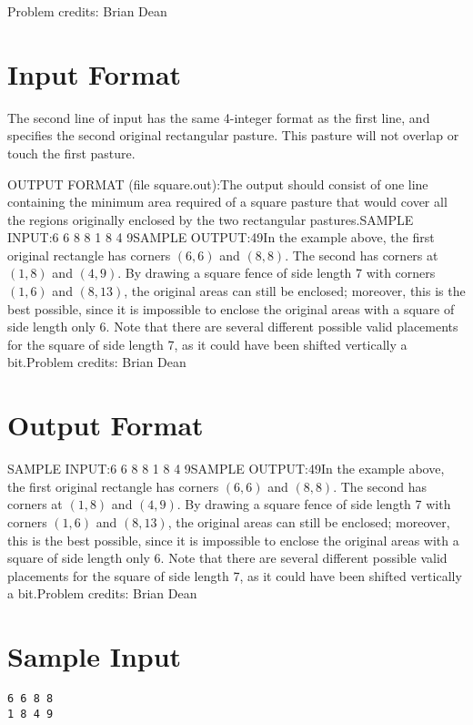 \documentclass[12pt]{article}
\begin{document}
Problem credits: Brian Dean



\section*{Input Format}
The second line of input has the same 4-integer format as the first line, and
specifies the second original rectangular pasture.  This pasture will not
overlap or touch the first pasture.

OUTPUT FORMAT (file square.out):The output should consist of one line containing the minimum area required of a
square pasture that would cover all the regions originally enclosed by the two
rectangular pastures.SAMPLE INPUT:6 6 8 8
1 8 4 9SAMPLE OUTPUT:49In the example above, the first original rectangle has corners $(6,6)$ and
$(8,8)$. The second has corners at $(1,8)$ and $(4,9)$.  By drawing a square fence
of side length 7 with corners $(1,6)$ and $(8,13)$, the original areas can still be enclosed; moreover, this is the best possible, since it is impossible to enclose the original areas with a square of side length only 6.  Note that there are several different possible valid placements for the square of side length 7, as it could have been shifted vertically a bit.Problem credits: Brian Dean

\section*{Output Format}
SAMPLE INPUT:6 6 8 8
1 8 4 9SAMPLE OUTPUT:49In the example above, the first original rectangle has corners $(6,6)$ and
$(8,8)$. The second has corners at $(1,8)$ and $(4,9)$.  By drawing a square fence
of side length 7 with corners $(1,6)$ and $(8,13)$, the original areas can still be enclosed; moreover, this is the best possible, since it is impossible to enclose the original areas with a square of side length only 6.  Note that there are several different possible valid placements for the square of side length 7, as it could have been shifted vertically a bit.Problem credits: Brian Dean

\section*{Sample Input}
\begin{verbatim}
6 6 8 8
1 8 4 9
\end{verbatim}
\end{document}
